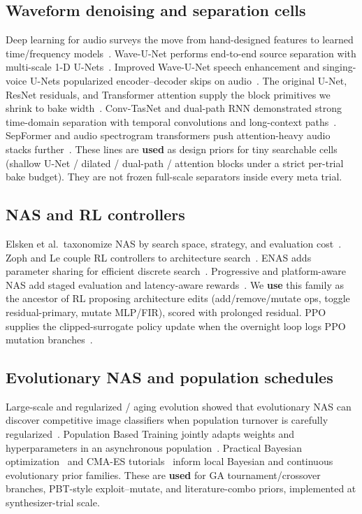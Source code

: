 \subsection{Waveform denoising and separation cells}
Deep learning for audio surveys the move from hand-designed features to learned time/frequency models~\cite{purwins2019}.
Wave-U-Net performs end-to-end source separation with multi-scale 1-D U-Nets~\cite{stoller2018}.
Improved Wave-U-Net speech enhancement and singing-voice U-Nets popularized encoder--decoder skips on audio~\cite{macartney2018,jansson2017}.
The original U-Net, ResNet residuals, and Transformer attention supply the block primitives we shrink to bake width~\cite{ronneberger2015,he2016resnet,vaswani2017}.
Conv-TasNet and dual-path RNN demonstrated strong time-domain separation with temporal convolutions and long-context paths~\cite{luo2019,luo2020dprnn}.
SepFormer and audio spectrogram transformers push attention-heavy audio stacks further~\cite{subakan2021,gong2021ast}.
These lines are \textbf{used} as design priors for tiny searchable cells (shallow U-Net / dilated / dual-path / attention blocks under a strict per-trial bake budget).
They are not frozen full-scale separators inside every meta trial.

\subsection{NAS and RL controllers}
Elsken et al.\ taxonomize NAS by search space, strategy, and evaluation cost~\cite{elsken2019}.
Zoph and Le couple RL controllers to architecture search~\cite{zoph2017nas}.
ENAS adds parameter sharing for efficient discrete search~\cite{pham2018}.
Progressive and platform-aware NAS add staged evaluation and latency-aware rewards~\cite{liu2018pnas,tan2019mnasnet}.
We \textbf{use} this family as the ancestor of RL proposing architecture edits (add/remove/mutate ops, toggle residual-primary, mutate MLP/FIR), scored with prolonged residual.
PPO supplies the clipped-surrogate policy update when the overnight loop logs PPO mutation branches~\cite{schulman2017}.

\subsection{Evolutionary NAS and population schedules}
Large-scale and regularized / aging evolution showed that evolutionary NAS can discover competitive image classifiers when population turnover is carefully regularized~\cite{real2017large,real2019}.
Population Based Training jointly adapts weights and hyperparameters in an asynchronous population~\cite{jaderberg2017}.
Practical Bayesian optimization~\cite{snoek2012} and CMA-ES tutorials~\cite{hansen2016cmaes} inform local Bayesian and continuous evolutionary prior families.
These are \textbf{used} for GA tournament/crossover branches, PBT-style exploit--mutate, and literature-combo priors, implemented at synthesizer-trial scale.

